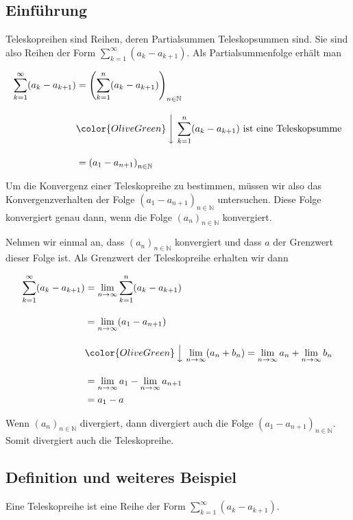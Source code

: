 \documentclass[fontsize=9pt,
               parskip=half-,
               DIV=14,
               listof=chapterentry,
               tocflat]{scrbook}
\begin{document}
\subsection{Einführung}

Teleskopreihen sind Reihen, deren Partialsummen Teleskopsummen sind. Sie sind also Reihen der Form $\sum _{k=1}^{\infty }(a_{k}-a_{k+1})$. Als Partialsummenfolge erhält man

\begin{align*}
\sum _{k=1}^{\infty }(a_{k}-a_{k+1})&=\left(\sum _{k=1}^{n}(a_{k}-a_{k+1})\right)_{n\in \mathbb {N} }\\[1em]&{\color {OliveGreen}\left\downarrow \ \sum _{k=1}^{n}(a_{k}-a_{k+1}){\text{ ist eine Teleskopsumme}}\right.}\\[1em]&=\left(a_{1}-a_{n+1}\right)_{n\in \mathbb {N} }
\end{align*}

Um die Konvergenz einer Teleskopreihe zu bestimmen, müssen wir also das Konvergenzverhalten der Folge $\left(a_{1}-a_{n+1}\right)_{n\in \mathbb {N} }$ untersuchen. Diese Folge konvergiert genau dann, wenn die Folge $(a_{n})_{n\in \mathbb {N} }$ konvergiert.

Nehmen wir einmal an, dass $(a_{n})_{n\in \mathbb {N} }$ konvergiert und dass $a$ der Grenzwert dieser Folge ist. Als Grenzwert der Teleskopreihe erhalten wir dann

\begin{align*}
\sum _{k=1}^{\infty }(a_{k}-a_{k+1})&=\lim _{n\to \infty }\sum _{k=1}^{n}(a_{k}-a_{k+1})\\[1em]&=\lim _{n\to \infty }(a_{1}-a_{n+1})\\[1em]&{\color {OliveGreen}\left\downarrow \ \lim _{n\to \infty }(a_{n}+b_{n})=\lim _{n\to \infty }a_{n}+\lim _{n\to \infty }b_{n}\right.}\\[1em]&=\lim _{n\to \infty }a_{1}-\lim _{n\to \infty }a_{n+1}\\&=a_{1}-a
\end{align*}

Wenn $(a_{n})_{n\in \mathbb {N} }$ divergiert, dann divergiert auch die Folge $(a_{1}-a_{n+1})_{n\in \mathbb {N} }$. Somit divergiert auch die Teleskopreihe.

\subsection{Definition und weiteres Beispiel}

\begin{definition*}[Teleskopreihe]
Eine Teleskopreihe ist eine Reihe der Form $\sum _{k=1}^{\infty }(a_{k}-a_{k+1})$.

\end{definition*}
\end{document}
